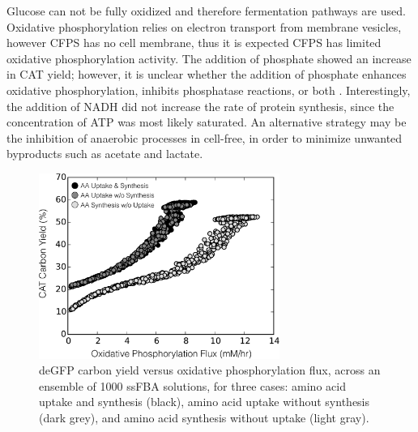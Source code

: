 \documentclass[journal=asbcd6,manuscript=article]{achemso}
\begin{document}
Glucose can not be fully oxidized and therefore fermentation pathways are used.
Oxidative phosphorylation relies on electron transport from membrane vesicles, however CFPS has no cell membrane, thus it is expected CFPS has limited oxidative phosphorylation activity.
The addition of phosphate showed an increase in CAT yield; however, it is unclear whether the addition of phosphate enhances oxidative phosphorylation, inhibits phosphatase reactions, or both \cite{Jewett:2008aa}.
Interestingly, the addition of NADH did not increase the rate of protein synthesis, since the concentration of ATP was most likely saturated.
An alternative strategy may be the inhibition of anaerobic processes in cell-free, in order to minimize unwanted byproducts such as acetate and lactate.
\begin{figure}[t!]
\includegraphics[width=0.7\textwidth]{./figs/Fig-4-OxyPhox-versus-Carbon-Yield.pdf}
\caption{deGFP carbon yield versus oxidative phosphorylation flux, across an ensemble of 1000 ssFBA solutions, for three cases: amino acid uptake and synthesis (black), amino acid uptake without synthesis (dark grey), and amino acid synthesis without uptake (light gray).}
\label{fig:oxphos_yield}
\end{figure}
\end{document}
